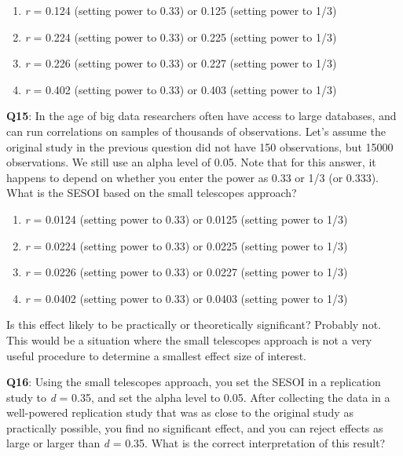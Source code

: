 \documentclass[
  oneside]{book}
\providecommand{\tightlist}{%
  \setlength{\itemsep}{0pt}\setlength{\parskip}{0pt}}
\begin{document}
\begin{enumerate}
\def\labelenumi{\Alph{enumi})}
\tightlist
\item
  \emph{r} = 0.124 (setting power to 0.33) or 0.125 (setting power to 1/3)
\item
  \emph{r} = 0.224 (setting power to 0.33) or 0.225 (setting power to 1/3)
\item
  \emph{r} = 0.226 (setting power to 0.33) or 0.227 (setting power to 1/3)
\item
  \emph{r} = 0.402 (setting power to 0.33) or 0.403 (setting power to 1/3)
\end{enumerate}

\textbf{Q15}: In the age of big data researchers often have access to large databases, and can run correlations on samples of thousands of observations. Let's assume the original study in the previous question did not have 150 observations, but 15000 observations. We still use an alpha level of 0.05. Note that for this answer, it happens to depend on whether you enter the power as 0.33 or 1/3 (or 0.333). What is the SESOI based on the small telescopes approach?

\begin{enumerate}
\def\labelenumi{\Alph{enumi})}
\tightlist
\item
  \emph{r} = 0.0124 (setting power to 0.33) or 0.0125 (setting power to 1/3)
\item
  \emph{r} = 0.0224 (setting power to 0.33) or 0.0225 (setting power to 1/3)
\item
  \emph{r} = 0.0226 (setting power to 0.33) or 0.0227 (setting power to 1/3)
\item
  \emph{r} = 0.0402 (setting power to 0.33) or 0.0403 (setting power to 1/3)
\end{enumerate}

Is this effect likely to be practically or theoretically significant? Probably not. This would be a situation where the small telescopes approach is not a very useful procedure to determine a smallest effect size of interest.

\textbf{Q16}: Using the small telescopes approach, you set the SESOI in a replication study to \emph{d} = 0.35, and set the alpha level to 0.05. After collecting the data in a well-powered replication study that was as close to the original study as practically possible, you find no significant effect, and you can reject effects as large or larger than \emph{d} = 0.35. What is the correct interpretation of this result?
\end{document}
